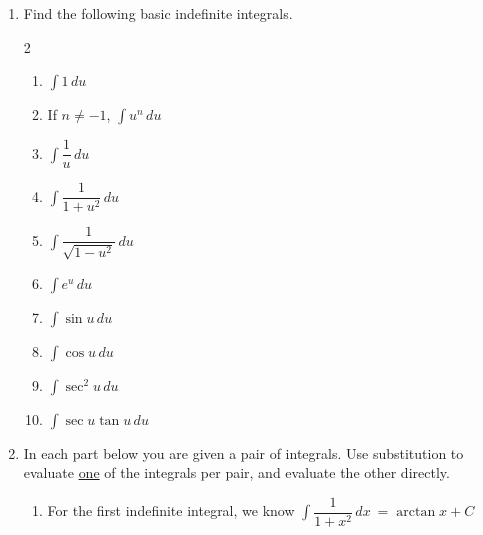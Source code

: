 \documentclass{article}
\begin{document}
\begin{enumerate}
    \item Find the following basic indefinite integrals. 
    \begin{multicols}{2}
    \begin{enumerate}
    \item $\displaystyle \int 1\,du\ $ \solonly{\textcolor{red}{$=u+C$}}
    \item If $n\neq-1$, $\displaystyle \int u^n\,du\ $
    \item $\displaystyle \int \dfrac{1}{u}\,du\ $
    \solonly{\textcolor{red}{$=\ln|u|+C$}}
    \item $\displaystyle \int \dfrac{1}{1+u^2}\,du\ $
    \solonly{\textcolor{red}{$=\arctan u+C$}}
    \item $\displaystyle \int \dfrac{1}{\sqrt{1-u^2}}\,du\ $
    \solonly{\textcolor{red}{$=\arcsin u+C$}\newline}
    \item $\displaystyle \int e^u\,du\ $
    \solonly{\textcolor{red}{$=e^u+C$}}
    \item $\displaystyle \int \sin u\,du\ $
  \solonly{\textcolor{red}{$=-\cos u+C$}}   
     \item $\displaystyle \int \cos u\,du\ $
     \solonly{\textcolor{red}{$=\sin u+C$}}
      \item $\displaystyle \int \sec^2 u\,du\ $
      \solonly{\textcolor{red}{$=\tan u+C$}}
       \item $\displaystyle \int \sec u \tan u \,du\ $
       \solonly{\textcolor{red}{$=\sec u+C$}}
    \end{enumerate}
    \end{multicols}

\item In each part below you are given a pair of integrals. Use substitution to evaluate \underline{one} of the integrals per pair, and evaluate the other directly.
\begin{enumerate}
    \item
        \begin{enumerate}
        \begin{solution}
         For the first indefinite integral, we know $\displaystyle \int \dfrac{1}{1+x^2}\,dx\ =\arctan x +C$ \newline


\end{solution}
\end{enumerate}
\end{enumerate}
\end{enumerate}
\end{document}
